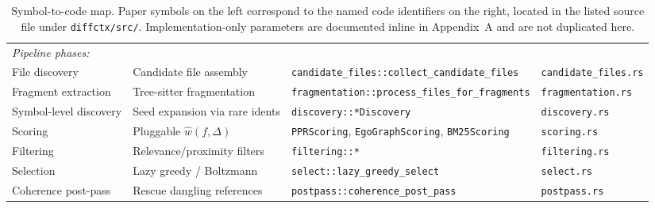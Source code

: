 \documentclass[11pt, a4paper]{article}
\begin{document}
\begin{table}[h]
{\begin{tabular}{llp{5cm}l}
\midrule
\multicolumn{4}{l}{\emph{Pipeline phases:}} \\
File discovery      & Candidate file assembly        & \texttt{candidate\_files::collect\_candidate\_files} & \texttt{candidate\_files.rs} \\
Fragment extraction & Tree-sitter fragmentation      & \texttt{fragmentation::process\_files\_for\_fragments} & \texttt{fragmentation.rs} \\
Symbol-level discovery & Seed expansion via rare idents & \texttt{discovery::*Discovery}              & \texttt{discovery.rs} \\
Scoring             & Pluggable $\hat{w}(f, \Delta)$ & \texttt{PPRScoring}, \texttt{EgoGraphScoring}, \texttt{BM25Scoring} & \texttt{scoring.rs} \\
Filtering           & Relevance/proximity filters    & \texttt{filtering::*}                          & \texttt{filtering.rs} \\
Selection           & Lazy greedy / Boltzmann        & \texttt{select::lazy\_greedy\_select}          & \texttt{select.rs} \\
Coherence post-pass & Rescue dangling references     & \texttt{postpass::coherence\_post\_pass}       & \texttt{postpass.rs} \\
\bottomrule
\end{tabular}}
\caption{Symbol-to-code map. Paper symbols on the left correspond to the named code identifiers on the right, located in the listed source file under \texttt{diffctx/src/}. Implementation-only parameters are documented inline in Appendix~A and are not duplicated here.}
\label{tab:symbol-map}
\end{table}



\end{document}
